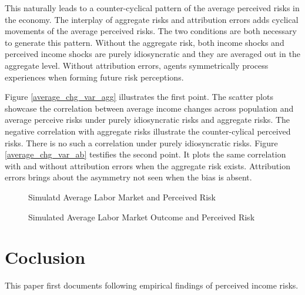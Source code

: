 \documentclass[12pt,notitlepage,onecolumn,aps,pra]{article}
\begin{document}
This naturally leads to a counter-cyclical pattern of the average
perceived risks in the economy. The interplay of aggregate risks and
attribution errors adds cyclical movements of the average perceived
risks. The two conditions are both necessary to generate this pattern.
Without the aggregate risk, both income shocks and perceived income
shocks are purely idiosyncratic and they are averaged out in the
aggregate level. Without attribution errors, agents symmetrically
process experiences when forming future risk perceptions.

Figure \ref{average_chg_var_agg} illustrates the first point. The
scatter plots showcase the correlation between average income changes
across population and average perceive risks under purely idiosyncratic
risks and aggregate risks. The negative correlation with aggregate risks
illustrate the counter-cylical perceived risks. There is no such a
correlation under purely idiosyncratic risks. Figure
\ref{average_chg_var_ab} testifies the second point. It plots the same
correlation with and without attribution errors when the aggregate risk
exists. Attribution errors brings about the asymmetry not seen when the
bias is absent.


    \begin{figure*}[!ht]
        \begin{center}\end{center}
        \caption{Simulatd Average Labor Market and Perceived Risk}
        \label{fig:recent_change_var_sim1}
    \end{figure*}
    

    \begin{figure*}[!ht]
        \begin{center}\end{center}
        \caption{Simulated Average Labor Market Outcome and Perceived Risk}
        \label{fig:recent_change_var_sim2}
    \end{figure*}
    
    \hypertarget{coclusion}{%
\section{Coclusion}\label{coclusion}}

This paper first documents following empirical findings of perceived
income risks.
\end{document}
